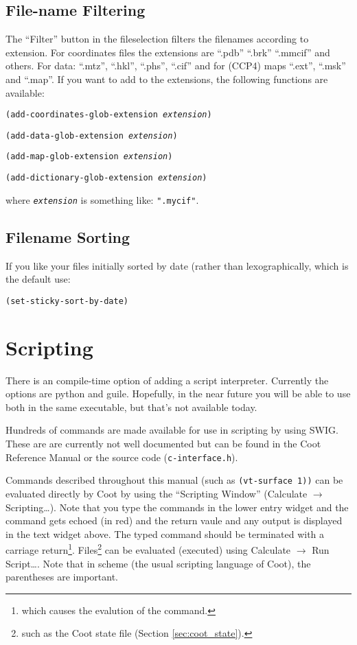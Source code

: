 \documentclass{book}
\begin{document}
\subsection{File-name Filtering}
 The ``Filter'' button in the fileselection
filters the filenames according to extension.  For coordinates files
the extensions are ``.pdb'' ``.brk'' ``.mmcif'' and others.  For data:
``.mtz'', ``.hkl'', ``.phs'', ``.cif'' and for (CCP4) maps ``.ext'',
``.msk'' and ``.map''.  If you want to add to the extensions, the
following functions are available:

\begin{trivlist}
\item \texttt{(add-coordinates-glob-extension \emph{extension})}
\item \texttt{(add-data-glob-extension \emph{extension})}
\item \texttt{(add-map-glob-extension \emph{extension})}
\item \texttt{(add-dictionary-glob-extension \emph{extension})}
\end{trivlist}
where \texttt{\emph{extension}} is something like: \texttt{".mycif"}.

\subsection{Filename Sorting}
If you like your files initially sorted by date (rather than
lexographically, which is the default use:

\texttt{(set-sticky-sort-by-date)}

\section{Scripting}
 There is an compile-time option of adding a script
interpreter.  Currently the options are python and guile.  Hopefully,
in the near future you will be able to use both in the same
executable, but that's not available today.

Hundreds of commands are made available for use in scripting by using
SWIG.  These are are currently not well documented but can be found in
the Coot Reference Manual or the source code (\texttt{c-interface.h}).

Commands described throughout this manual (such as \texttt{(vt-surface
  1))} can be evaluated directly by Coot by
using the ``Scripting Window'' (\textsf{Calculate $\rightarrow$
  Scripting\ldots}). Note that you type the commands in the lower
entry widget and the command gets echoed (in red) and the return vaule
and any output is displayed in the text widget above.  The typed
command should be terminated with a carriage return\footnote{which
  causes the evalution of the command.}.  Files\footnote{such as the
  Coot state file (Section \ref{sec:coot_state}).} can be evaluated
(executed) using \textsf{Calculate $\rightarrow$ Run Script\ldots}.
Note that in scheme (the usual scripting language of Coot), the
parentheses are important.
\end{document}
